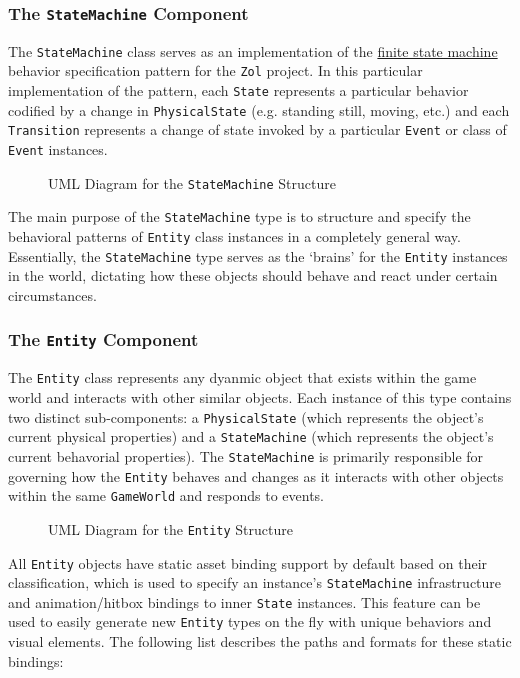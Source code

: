\documentclass{article}
\newcommand{\classname}[1] {\texttt{#1}}
\newcommand{\projectname}[0] {\texttt{Zol} }
\newcommand{\hreffsm}[1] {\href{http://en.wikipedia.org/wiki/Finite-state\_ machine}{#1}}
\newcommand{\insertdiagram}[2]
{
	\begin{figure}[H]
		\centering
		\fbox{\texttt{[image: figures/\#1]}}
		\caption{UML Diagram for the \classname{#1} Structure}
	\end{figure}
}
\begin{document}
			\subsubsection[\classname{StateMachine}]{The \classname{StateMachine} Component}
			The \classname{StateMachine} class serves as an implementation of
			the \hreffsm{finite state machine} behavior specification pattern for
			the \projectname project.
			In this particular implementation of the pattern, each \classname{State} 
			represents a particular behavior codified by a change in 
			\classname{PhysicalState} (e.g. standing still, moving, etc.)
			and each \classname{Transition} represents a change of state invoked
			by a particular \classname{Event} or class of \classname{Event} instances.

			\insertdiagram{StateMachine}{2.0in}

			The main purpose of the \classname{StateMachine} type is to structure
			and specify the behavioral patterns of \classname{Entity} class
			instances in a completely general way.  Essentially, the 
			\classname{StateMachine} type serves as the `brains' for the
			\classname{Entity} instances in the world, dictating how these
			objects should behave and react under certain circumstances.

			\subsubsection[\classname{Entity}]{The \classname{Entity} Component}
			The \classname{Entity} class represents any dyanmic object that
			exists within the game world and interacts with other similar
			objects.  Each instance of this type contains two distinct 
			sub-components: a \classname{PhysicalState} (which represents the
			object's current physical properties) and a \classname{StateMachine}
			(which represents the object's current behavorial properties).
			The \classname{StateMachine} is primarily responsible for governing
			how the \classname{Entity} behaves and changes as it interacts with
			other objects within the same \classname{GameWorld} and responds to
			events.

			\insertdiagram{Entity}{2.0in}

			All \classname{Entity} objects have static asset binding support
			by default based on their classification, which is used to specify 
			an instance's \classname{StateMachine} infrastructure and animation/hitbox 
			bindings to inner \classname{State} instances.  This feature can 
			be used to easily generate new \classname{Entity} types on the fly 
			with unique behaviors and visual elements.  The following list
			describes the paths and formats for these static bindings:
\end{document}
